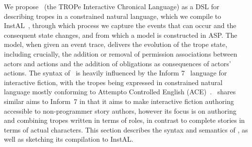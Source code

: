 We propose \tropical\ (the TROPe Interactive Chronical Language) as a DSL for describing tropes in a constrained natural language, which we compile to InstAL~\cite{cliffe2007specifying}, through which process we capture the events that can occur and the consequent state changes, and from which a model is constructed in ASP.  The model, when given an event trace, delivers the evolution of the trope state, including crucially, the addition or removal of permission associations between actors and actions and the addition of obligations as consequences of actors' actions.  The syntax of \tropical\ is heavily influenced by the Inform 7~\cite{reed2010creating} language for interactive fiction, with the tropes being expressed in constrained natural language mostly conforming to Attempto Controlled English (ACE)~\cite{fuchs1996attempto}. \tropical\ shares similar aims to Inform~7 in that it aims to make interactive fiction authoring accessible to non-programmer story authors, however its focus is on authoring and combining tropes written in terms of roles, in contrast to complete stories in terms of actual characters. This section describes the syntax and semantics of \tropical, as well as sketching its compilation to InstAL.

